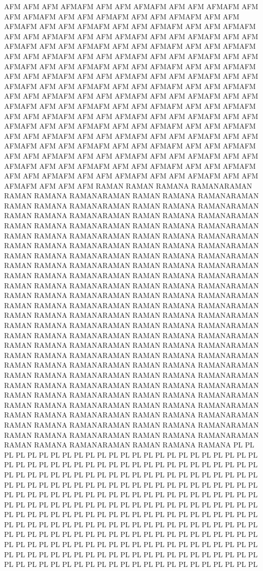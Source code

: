 \documentclass[%
 reprint,
superscriptaddress,
 amsmath,amssymb,
 aps,
prb,
]{revtex4-1}
\begin{document}
\indent AFM AFM AFM AFMAFM AFM AFM AFMAFM AFM AFM AFMAFM AFM AFM AFMAFM AFM AFM AFMAFM AFM AFM AFMAFM AFM AFM AFMAFM AFM AFM AFMAFM AFM AFM AFMAFM AFM AFM AFMAFM AFM AFM AFMAFM AFM AFM AFMAFM AFM AFM AFMAFM AFM AFM AFMAFM AFM AFM AFMAFM AFM AFM AFMAFM AFM AFM AFMAFM AFM AFM AFMAFM AFM AFM AFMAFM AFM AFM AFMAFM AFM AFM AFMAFM AFM AFM AFMAFM AFM AFM AFMAFM AFM AFM AFMAFM AFM AFM AFMAFM AFM AFM AFMAFM AFM AFM AFMAFM AFM AFM AFMAFM AFM AFM AFMAFM AFM AFM AFMAFM AFM AFM AFMAFM AFM AFM AFMAFM AFM AFM AFMAFM AFM AFM AFMAFM AFM AFM AFMAFM AFM AFM AFMAFM AFM AFM AFMAFM AFM AFM AFMAFM AFM AFM AFMAFM AFM AFM AFMAFM AFM AFM AFMAFM AFM AFM AFMAFM AFM AFM AFMAFM AFM AFM AFMAFM AFM AFM AFMAFM AFM AFM AFMAFM AFM AFM AFMAFM AFM AFM AFMAFM AFM AFM AFMAFM AFM AFM AFMAFM AFM AFM AFMAFM AFM AFM AFMAFM AFM AFM AFMAFM AFM AFM AFMAFM AFM AFM AFMAFM AFM AFM AFMAFM AFM AFM AFMAFM AFM AFM AFMAFM AFM AFM AFMAFM AFM AFM AFMAFM AFM AFM AFMAFM AFM AFM AFMAFM AFM AFM AFMAFM AFM AFM AFM \newline
\indent RAMAN RAMAN RAMANA RAMANARAMAN RAMAN RAMANA RAMANARAMAN RAMAN RAMANA RAMANARAMAN RAMAN RAMANA RAMANARAMAN RAMAN RAMANA RAMANARAMAN RAMAN RAMANA RAMANARAMAN RAMAN RAMANA RAMANARAMAN RAMAN RAMANA RAMANARAMAN RAMAN RAMANA RAMANARAMAN RAMAN RAMANA RAMANARAMAN RAMAN RAMANA RAMANARAMAN RAMAN RAMANA RAMANARAMAN RAMAN RAMANA RAMANARAMAN RAMAN RAMANA RAMANARAMAN RAMAN RAMANA RAMANARAMAN RAMAN RAMANA RAMANARAMAN RAMAN RAMANA RAMANARAMAN RAMAN RAMANA RAMANARAMAN RAMAN RAMANA RAMANARAMAN RAMAN RAMANA RAMANARAMAN RAMAN RAMANA RAMANARAMAN RAMAN RAMANA RAMANARAMAN RAMAN RAMANA RAMANARAMAN RAMAN RAMANA RAMANARAMAN RAMAN RAMANA RAMANARAMAN RAMAN RAMANA RAMANARAMAN RAMAN RAMANA RAMANARAMAN RAMAN RAMANA RAMANARAMAN RAMAN RAMANA RAMANARAMAN RAMAN RAMANA RAMANARAMAN RAMAN RAMANA RAMANARAMAN RAMAN RAMANA RAMANARAMAN RAMAN RAMANA RAMANARAMAN RAMAN RAMANA RAMANARAMAN RAMAN RAMANA RAMANARAMAN RAMAN RAMANA RAMANARAMAN RAMAN RAMANA RAMANARAMAN RAMAN RAMANA RAMANARAMAN RAMAN RAMANA RAMANARAMAN RAMAN RAMANA RAMANARAMAN RAMAN RAMANA RAMANARAMAN RAMAN RAMANA RAMANARAMAN RAMAN RAMANA RAMANARAMAN RAMAN RAMANA RAMANARAMAN RAMAN RAMANA RAMANARAMAN RAMAN RAMANA RAMANARAMAN RAMAN RAMANA RAMANARAMAN RAMAN RAMANA RAMANARAMAN RAMAN RAMANA RAMANARAMAN RAMAN RAMANA RAMANARAMAN RAMAN RAMANA RAMANARAMAN RAMAN RAMANA RAMANARAMAN RAMAN RAMANA RAMANA \newline
\indent PL PL PL PL PL PL PL PL PL PL PL PL PL PL PL PL PL PL PL PL PL PL PL PL PL PL PL PL PL PL PL PL PL PL PL PL PL PL PL PL PL PL PL PL PL PL PL PL PL PL PL PL PL PL PL PL PL PL PL PL PL PL PL PL PL PL PL PL PL PL PL PL PL PL PL PL PL PL PL PL PL PL PL PL PL PL PL PL PL PL PL PL PL PL PL PL PL PL PL PL PL PL PL PL PL PL PL PL PL PL PL PL PL PL PL PL PL PL PL PL PL PL PL PL PL PL PL PL PL PL PL PL PL PL PL PL PL PL PL PL PL PL PL PL PL PL PL PL PL PL PL PL PL PL PL PL PL PL PL PL PL PL PL PL PL PL PL PL PL PL PL PL PL PL PL PL PL PL PL PL PL PL PL PL PL PL PL PL PL PL PL PL PL PL PL PL PL PL PL PL PL PL PL PL PL PL PL PL PL PL PL PL PL PL PL PL PL PL PL PL PL PL PL PL PL PL PL PL PL PL PL PL PL PL PL PL PL PL PL PL PL PL PL PL PL PL PL PL PL PL PL PL PL PL PL PL PL PL PL PL PL PL PL PL PL PL \newline
\end{document}
